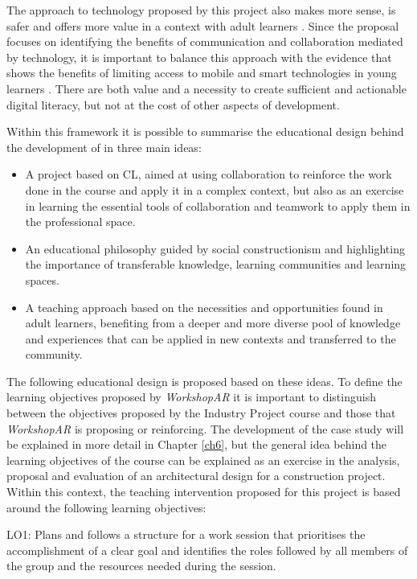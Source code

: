 The approach to technology proposed by this project also makes more sense, is safer and offers more value in a context with adult learners \parencite{shopova_2014,jimoyiannis_2011}.
Since the proposal focuses on identifying the benefits of communication and collaboration mediated by technology, it is important to balance this approach with the evidence that
shows the benefits of limiting access to mobile and smart technologies in young learners \parencite{cheriti_2025}. There are both value and a necessity to create sufficient and
actionable digital literacy, but not at the cost of other aspects of development.

Within this framework it is possible to summarise the educational design behind the development of in three main ideas:

\begin{itemize}
    \item A project based on \ac{CL}, aimed at using collaboration to reinforce the work done in the course and apply it in a complex context, but also as an exercise in
    learning the essential tools of collaboration and teamwork to apply them in the professional space.
    \item An educational philosophy guided by social constructionism and highlighting the importance of transferable knowledge, learning communities and learning spaces.
    \item A teaching approach based on the necessities and opportunities found in adult learners, benefiting from a deeper and more diverse pool of knowledge and
    experiences that can be applied in new contexts and transferred to the community.
\end{itemize}

The following educational design is proposed based on these ideas. To define the learning objectives proposed by \emph{WorkshopAR} it is important to distinguish between the
objectives proposed by the Industry Project course and those that \emph{WorkshopAR} is proposing or reinforcing. The development of the case study will be explained in more
detail in Chapter \ref{ch6}, but the general idea behind the learning objectives of the course can be explained as an exercise in the analysis, proposal and evaluation of
an architectural design for a construction project. Within this context, the teaching intervention proposed for this project is based around the following learning
objectives:

\begin{displayquote}
    LO1: Plans and follows a structure for a work session that prioritises the accomplishment of a clear goal and identifies the roles followed by all members of the group
    and the resources needed during the session.
\end{displayquote}

